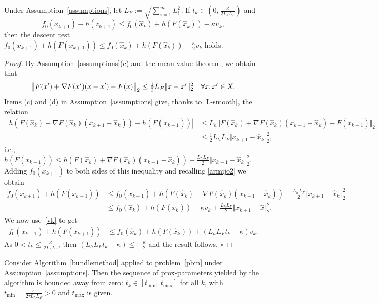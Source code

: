 \documentclass[smallextended,envcountsect]{svjour3}
\newcommand{\norm}[1]{\textstyle{\Vert} #1 \textstyle{\Vert}_2}
\newcommand{\mybox}{{\hfill $\square$}}
\begin{document}
\begin{lemma}\label{lem:small_tk}
Under Assumption~\ref{assumptions}, let $L_F:= \sqrt{\sum_{i=1}^m L_i^2}$.
If $t_k \in (0,\frac{\kappa}{2L_hL_F})$ and 
\begin{equation}\label{armijo2}
f_0(x_{k+1})+ h(z_{k+1})\leq f_0(\hat x_{k})+ h(F(\hat x_k))-  \kappa v_k,
\end{equation}  then the descent test
$
f_0(x_{k+1}) +h(F(x_{k+1})) \leq f_0(\hat x_{k})+ h(F(\hat x_k))-  \frac{\kappa}{2} v_k
$ %
holds.
\end{lemma}
\begin{proof}
By Assumption~\ref{assumptions}(c) and the mean value theorem, we obtain that 
\begin{equation}\label{L-smooth}
\big\|F(x')+\nabla F(x') (x-x') - F(x)\big\|_2\\
\leq \displaystyle \tfrac{1}{2}L_F\norm{x- x'}^2\quad \forall x,x' \in X.
\end{equation}
Items (c) and (d) in Assumption~\ref{assumptions} give, thanks to \eqref{L-smooth}, the relation
\begin{align*}
|h(F(\hat x_k)+\nabla F(\hat x_k) (x_{k+1}-\hat x_k))-h(F(x_{k+1}))|&\leq L_h\norm{F(\hat x_k)+\nabla F(\hat x_k) (x_{k+1}-\hat x_k) - F(x_{k+1})}\\
&\leq \frac{1}{2}L_h L_F\norm{x_{k+1}-\hat x_k}^2,
\end{align*}
i.e.,
$
h(F(x_{k+1})) \leq h(F(\hat x_k)+\nabla F(\hat x_k) (x_{k+1}-\hat x_k)) +\frac{L_h L_F}{2}\norm{x_{k+1}-\hat x_k}^2 .
$
Adding $f_0(x_{k+1})$ to both sides of this inequality and recalling \eqref{armijo2} we obtain
\begin{align*}
f_0(x_{k+1}) +h(F(x_{k+1}))& \leq f_0(x_{k+1})+ h(F(\hat x_k)+\nabla F(\hat x_k) (x_{k+1}-\hat x_k)) +\frac{L_h L_F}{2}\norm{x_{k+1}-\hat x_k}^2 \\
&\leq f_0(\hat x_{k})+ h(F(\hat x_k)) -\kappa  v_k + \frac{L_h L_F}{2}\norm{x_{k+1}-\hat x}^2.
\end{align*}
We now use~\eqref{vk} to get
\begin{align*}
f_0(x_{k+1}) +h(F(x_{k+1}))& \leq %
f_0(\hat x_{k})+ h(F(\hat x_k)) + (L_h L_Ft_k-\kappa)v_k.
\end{align*}
As $0<t_k\leq \frac{\kappa}{2L_hL_F}$, then $(L_h L_Ft_k-\kappa) \leq -\frac{\kappa}{2}$ and the
result follows. \mybox %
\end{proof}
%
\begin{lemma}\label{lem:bound_tk}
Consider Algorithm~\ref{bundlemethod} applied to problem~\eqref{pbm} under Assumption~\ref{assumptions}.
Then the sequence of prox-parameters yielded by the algorithm is bounded away from zero: $t_k \in [t_{\min},\,t_{\max}]$ for all $k$, with $t_{\min}= \frac{\kappa}{2\tau L_hL_F}>0$ and $t_{\max}$ is given.
\end{lemma}
\end{document}
